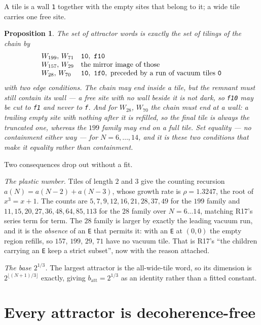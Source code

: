 \documentclass[11pt]{article}
\newcommand{\rt}[1]{\texttt{#1}}
\theoremstyle{plain}
\newtheorem{proposition}{Proposition}
\begin{document}
A tile is a wall \rt{1} together with the empty sites that belong to it; a wide
tile carries one free site.

\begin{proposition}
The set of attractor words is \emph{exactly} the set of tilings of the chain by
\[
\begin{array}{ll}
W_{199},\,W_{71} & \rt{10},\ \rt{f10}\\
W_{157},\,W_{29} & \text{the mirror image of those}\\
W_{28},\,W_{70}  & \rt{10},\ \rt{1f0},\ \text{preceded by a run of vacuum tiles \rt{0}}
\end{array}
\]
with two edge conditions. The chain may end inside a tile, but the remnant must
still contain its wall --- a free site with no wall beside it is not dark, so
\rt{f10} may be cut to \rt{f1} and never to \rt{f}. And for $W_{28}$, $W_{70}$
the chain must end \emph{at} a wall: a trailing empty site with nothing after it
is refilled, so the final tile is always the truncated one, whereas the $199$
family may end on a full tile. Set equality --- no containment either way ---
for $N=6,\dots,14$, and it is these two conditions that make it equality rather
than containment.
\end{proposition}

\noindent Two consequences drop out without a fit.

\emph{The plastic number.} Tiles of length $2$ and $3$ give the counting
recursion $a(N)=a(N-2)+a(N-3)$, whose growth rate is $\rho=1.3247$, the root of
$x^3=x+1$. The counts are $5,7,9,12,16,21,28,37,49$ for the $199$ family and
$11,15,20,27,36,48,64,85,113$ for the $28$ family over $N=6\ldots14$, matching
R17's series term for term. The $28$ family is larger by exactly the leading
vacuum run, and it is the \emph{absence} of an \rt{E} that permits it: with an
\rt{E} at $(0,0)$ the empty region refills, so $157$, $199$, $29$, $71$ have no
vacuum tile. That is R17's ``the children carrying an \rt{E} keep a strict
subset'', now with the reason attached.

\emph{The base $2^{1/3}$.} The largest attractor is the all-wide-tile word, so
its dimension is $2^{\lfloor (N+1)/3\rfloor}$ exactly, giving
$b_\mathrm{att}=2^{1/3}$ as an identity rather than a fitted constant.

\section{Every attractor is decoherence-free}
\end{document}
